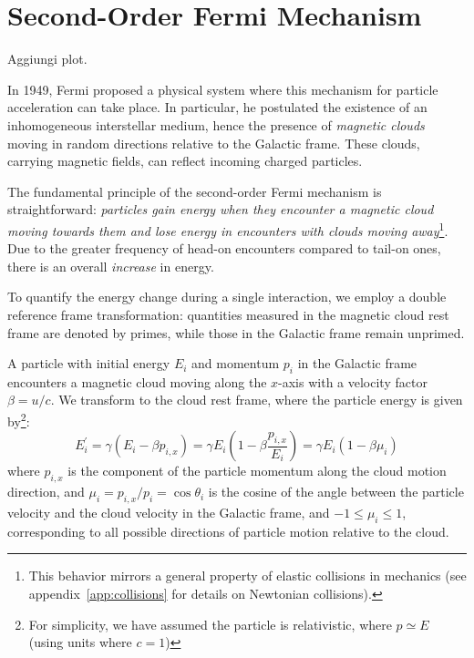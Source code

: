 \section{Second-Order Fermi Mechanism}

{\color{red}Aggiungi plot.}

In 1949, Fermi proposed a physical system where this mechanism for particle acceleration can take place. In particular, he postulated the existence of an inhomogeneous interstellar medium, hence the presence of \emph{magnetic clouds} moving in random directions relative to the Galactic frame. These clouds, carrying magnetic fields, can reflect incoming charged particles.

The fundamental principle of the second-order Fermi mechanism is straightforward: \emph{particles gain energy when they encounter a magnetic cloud moving towards them and lose energy in encounters with clouds moving away}\footnote{This behavior mirrors a general property of elastic collisions in mechanics (see appendix~\ref{app:collisions} for details on Newtonian collisions).}. Due to the greater frequency of head-on encounters compared to tail-on ones, there is an overall \emph{increase} in energy.

To quantify the energy change during a single interaction, we employ a double reference frame transformation: quantities measured in the magnetic cloud rest frame are denoted by primes, while those in the Galactic frame remain unprimed.

A particle with initial energy \( E_i \) and momentum \( p_i \) in the Galactic frame encounters a magnetic cloud moving along the \( x \)-axis with a velocity factor \( \beta = u / c \). We transform to the cloud rest frame, where the particle energy is given by\footnote{For simplicity, we have assumed the particle is relativistic, where \( p \simeq E \) (using units where \( c = 1 \))}:
\begin{equation}
E_i^\prime = \gamma (E_i - \beta p_{i,x}) = \gamma E_i \left( 1 - \beta \frac{p_{i,x}}{E_i} \right) = \gamma E_i \left( 1 - \beta \mu_i \right)
\end{equation}
where \( p_{i,x} \) is the component of the particle momentum along the cloud motion direction, and \( \mu_i = p_{i,x} / p_i = \cos\theta_i \) is the cosine of the angle between the particle velocity and the cloud velocity in the Galactic frame, and \( -1 \leq \mu_i \leq 1 \), corresponding to all possible directions of particle motion relative to the cloud.

